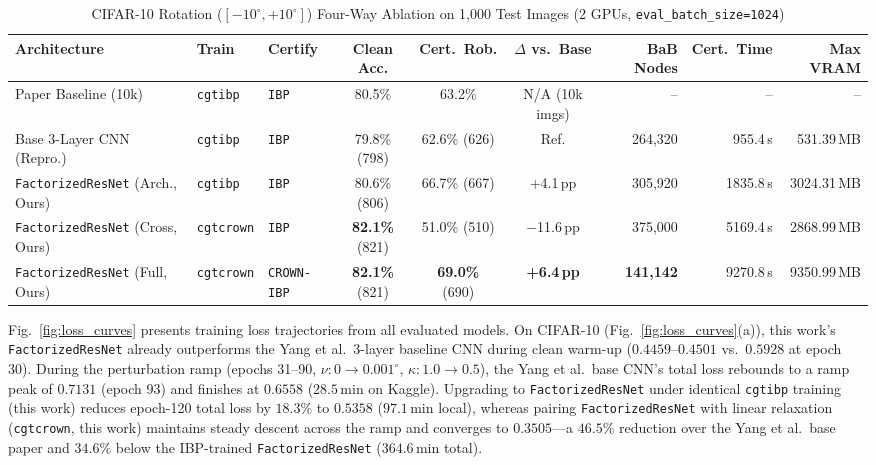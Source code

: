 \documentclass[conference]{IEEEtran}
\begin{document}
\begin{table}[t]
\caption{CIFAR-10 Rotation ($[-10^\circ, +10^\circ]$) Four-Way Ablation
         on 1,000 Test Images (2 GPUs, \texttt{eval\_batch\_size=1024})}
\centering
\footnotesize
\setlength{\tabcolsep}{2.6pt}
\renewcommand{\arraystretch}{1.06}
\begin{tabular}{|l|l|l|c|c|c|r|r|r|}
\hline
\textbf{Architecture} &
\textbf{Train} &
\textbf{Certify} &
\textbf{Clean Acc.} &
\textbf{Cert.\ Rob.} &
\textbf{$\Delta$ vs.\ Base} &
\textbf{BaB Nodes} &
\textbf{Cert.\ Time} &
\textbf{Max VRAM} \\
\hline
Paper Baseline (10k)~\cite{b3} &
  \texttt{cgtibp} & \texttt{IBP} &
  80.5\% & 63.2\% & N/A (10k imgs) & -- & -- & -- \\
\hline
Base 3-Layer CNN (Repro.)~\cite{b3} &
  \texttt{cgtibp} & \texttt{IBP} &
  79.8\% (798) & 62.6\% (626) & Ref. & 264,320 & 955.4\,s & 531.39\,MB \\
\texttt{FactorizedResNet} (Arch., Ours) &
  \texttt{cgtibp} & \texttt{IBP} &
  80.6\% (806) & 66.7\% (667) & +4.1\,pp & 305,920 & 1835.8\,s & 3024.31\,MB \\
\texttt{FactorizedResNet} (Cross, Ours) &
  \texttt{cgtcrown} & \texttt{IBP} &
  \textbf{82.1\%} (821) & 51.0\% (510) & $-$11.6\,pp & 375,000 & 5169.4\,s & 2868.99\,MB \\
\texttt{FactorizedResNet} (Full, Ours) &
  \texttt{cgtcrown} & \texttt{CROWN-IBP} &
  \textbf{82.1\%} (821) & \textbf{69.0\%} (690) & \textbf{+6.4\,pp} &
  \textbf{141,142} & 9270.8\,s & 9350.99\,MB \\
\hline
\end{tabular}
\label{tab:cifar_ablation}
\end{table}

Fig.~\ref{fig:loss_curves} presents training loss trajectories from all
evaluated models.
On CIFAR-10 (Fig.~\ref{fig:loss_curves}(a)), this work's
\texttt{FactorizedResNet} already outperforms the Yang et al.\ 3-layer
baseline CNN during clean warm-up ($0.4459$--$0.4501$ vs.\ $0.5928$ at
epoch 30).
During the perturbation ramp (epochs 31--90, $\nu: 0 \to 0.001^\circ$,
$\kappa: 1.0 \to 0.5$), the Yang et al.\ base CNN's total loss rebounds
to a ramp peak of $0.7131$ (epoch 93) and finishes at $0.6558$
($28.5\,\text{min}$ on Kaggle).
Upgrading to \texttt{FactorizedResNet} under identical \texttt{cgtibp}
training (this work) reduces epoch-120 total loss by $18.3\%$ to $0.5358$
($97.1\,\text{min}$ local), whereas pairing \texttt{FactorizedResNet} with
linear relaxation (\texttt{cgtcrown}, this work) maintains steady descent
across the ramp and converges to $0.3505$---a $46.5\%$ reduction over the
Yang et al.\ base paper and $34.6\%$ below the IBP-trained \texttt{FactorizedResNet}
($364.6\,\text{min}$ total).
\end{document}
